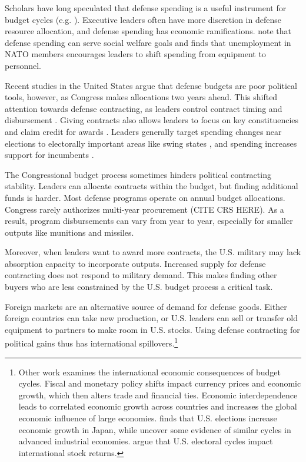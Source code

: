 \documentclass[12pt]{article}
\begin{document}
Scholars have long speculated that defense spending is a useful instrument for budget cycles (e.g. \cite{Tufte1978, Mintz1988}).
Executive leaders often have more discretion in defense resource allocation, and defense spending has economic ramifications.
\citet{WhittenWilliams2011} note that defense spending can serve social welfare goals and \citet{Becker2021} finds that unemployment in NATO members encourages leaders to shift spending from equipment to personnel.


Recent studies in the United States argue that defense budgets are poor political tools, however, as Congress makes allocations two years ahead.
This shifted attention towards defense contracting, as leaders control contract timing and disbursement \citep{Mayer1995, DerouenHeo2000}.
Giving contracts also allows leaders to focus on key constituencies and claim credit for awards \citep{DerouenHeo2000}. 
Leaders generally target spending changes near elections to electorally important areas like swing states \citep{KrinerReeves2015}, and spending increases support for incumbents \citep{KrinerReeves2012}.


The Congressional budget process sometimes hinders political contracting stability. 
Leaders can allocate contracts within the budget, but finding additional funds is harder. 
Most defense programs operate on annual budget allocations.
Congress rarely authorizes multi-year procurement (CITE CRS HERE). 
As a result, program disbursements can vary from year to year, especially for smaller outputs like munitions and missiles. 


Moreover, when leaders want to award more contracts, the U.S. military may lack absorption capacity to incorporate outputs.
Increased supply for defense contracting does not respond to military demand.
This makes finding other buyers who are less constrained by the U.S. budget process a critical task.


Foreign markets are an alternative source of demand for defense goods.
Either foreign countries can take new production, or U.S. leaders can sell or transfer old equipment to partners to make room in U.S. stocks. 
Using defense contracting for political gains thus has international spillovers.\footnote{%
Other work examines the international economic consequences of budget cycles.
Fiscal and monetary policy shifts impact currency prices and economic growth, which then alters trade and financial ties. 
Economic interdependence leads to correlated economic growth across countries \citep{ArtisZhang1999, Kayser2006} and increases the global economic influence of large economies. 
\citet{Ito1991} finds that U.S. elections increase economic growth in Japan, while \citet{ThompsonZuk1983} uncover some evidence of similar cycles in advanced industrial economies.
\citet{FoersterSchmitz1997} argue that U.S. electoral cycles impact international stock returns.
}
\end{document}
